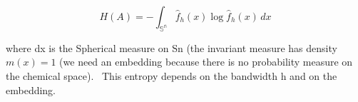 \[ H(A) = -\int_\mathbb{{S}^n}  \hat{f}_h(x)\log  \hat{f}_h(x) \,dx  \]



 where dx is the Spherical measure on Sn (the invariant measure has density $m(x)=1$ (we need an embedding because there is no probability measure on the chemical space). 
This entropy depends on the bandwidth h and on the embedding.
